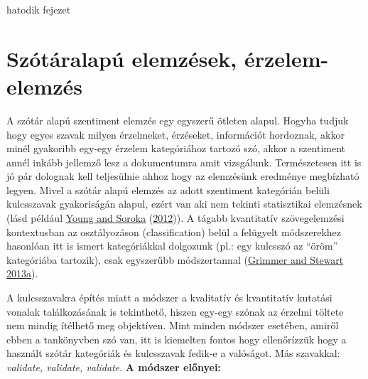 \documentclass[
]{book}
\begin{document}
hatodik fejezet

\hypertarget{szuxf3tuxe1ralapuxfa-elemzuxe9sek-uxe9rzelem-elemzuxe9s}{%
\chapter{Szótáralapú elemzések,
érzelem-elemzés}\label{szuxf3tuxe1ralapuxfa-elemzuxe9sek-uxe9rzelem-elemzuxe9s}}

A szótár alapú szentiment elemzés egy egyszerű ötleten alapul. Hogyha
tudjuk hogy egyes szavak milyen érzelmeket, érzéseket, információt
hordoznak, akkor minél gyakoribb egy-egy érzelem kategóriához tartozó
szó, akkor a szentiment annél inkább jellemző lesz a dokumentumra amit
vizsgálunk. Természetesen itt is jó pár dolognak kell teljesülnie ahhoz
hogy az elemzésünk eredménye megbízható legyen. Mivel a szótár alapú
elemzés az adott szentiment kategórián belüli kulcsszavak gyakoriságán
alapul, ezért van aki nem tekinti statisztikai elemzésnek (lásd például
\protect\hyperlink{ref-young2012affective}{Young and Soroka}
(\protect\hyperlink{ref-young2012affective}{2012})). A tágabb
kvantitatív szövegelemzési kontextusban az osztályozáson
(classification) belül a felügyelt módszerekhez hasonlóan itt is ismert
kategóriákkal dolgozunk (pl.: egy kulcsszó az ``öröm'' kategóriába
tartozik), csak egyszerűbb módszertannal
(\protect\hyperlink{ref-grimmer2013text}{Grimmer and Stewart 2013a}).

A kulcsszavakra építés miatt a módszer a kvalitatív és kvantitatív
kutatási vonalak találkozásának is tekinthető, hiszen egy-egy szónak az
érzelmi töltete nem mindig ítélhető meg objektíven. Mint minden módszer
esetében, amiről ebben a tankönyvben szó van, itt is kiemelten fontos
hogy ellenőrízzük hogy a használt szótár kategóriák és kulcsszavak
fedik-e a valóságot. Más szavakkal: \emph{validate, validate, validate}.
\textbf{A módszer előnyei:}
\end{document}
